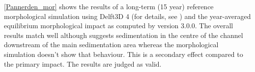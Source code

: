 \autoref{Pannerden_mor} shows the results of a long-term (15 year) reference morphological simulation using Delft3D 4 (for details, see \citet{GiriJagers2022}) and the year-averaged equilibrium morphological impact as computed by \dfmi version 3.0.0.
The overall results match well although \dfmi suggests sedimentation in the centre of the channel downstream of the main sedimentation area whereas the morphological simulation doesn't show that behaviour.
This is a secondary effect compared to the primary impact.
The results are judged as valid.